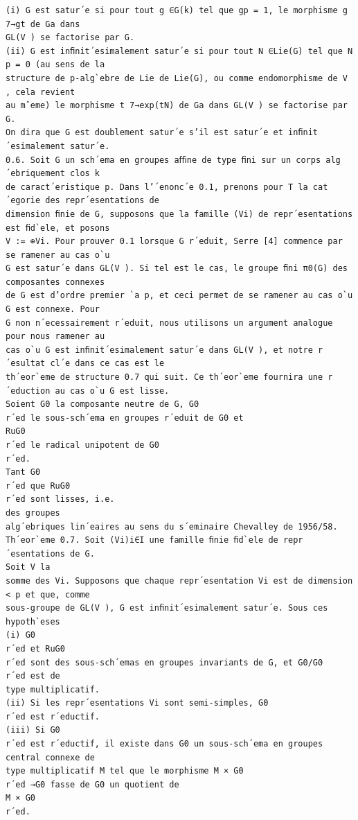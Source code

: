\documentclass[10pt]{article}
\begin{document}
\begin{verbatim}
(i) G est satur´e si pour tout g ∈G(k) tel que gp = 1, le morphisme g 7→gt de Ga dans
GL(V ) se factorise par G.
(ii) G est inﬁnit´esimalement satur´e si pour tout N ∈Lie(G) tel que N p = 0 (au sens de la
structure de p-alg`ebre de Lie de Lie(G), ou comme endomorphisme de V , cela revient
au mˆeme) le morphisme t 7→exp(tN) de Ga dans GL(V ) se factorise par G.
On dira que G est doublement satur´e s’il est satur´e et inﬁnit´esimalement satur´e.
0.6. Soit G un sch´ema en groupes aﬃne de type ﬁni sur un corps alg´ebriquement clos k
de caract´eristique p. Dans l’´enonc´e 0.1, prenons pour T la cat´egorie des repr´esentations de
dimension ﬁnie de G, supposons que la famille (Vi) de repr´esentations est ﬁd`ele, et posons
V := ⊕Vi. Pour prouver 0.1 lorsque G r´eduit, Serre [4] commence par se ramener au cas o`u
G est satur´e dans GL(V ). Si tel est le cas, le groupe ﬁni π0(G) des composantes connexes
de G est d’ordre premier `a p, et ceci permet de se ramener au cas o`u G est connexe. Pour
G non n´ecessairement r´eduit, nous utilisons un argument analogue pour nous ramener au
cas o`u G est inﬁnit´esimalement satur´e dans GL(V ), et notre r´esultat cl´e dans ce cas est le
th´eor`eme de structure 0.7 qui suit. Ce th´eor`eme fournira une r´eduction au cas o`u G est lisse.
Soient G0 la composante neutre de G, G0
r´ed le sous-sch´ema en groupes r´eduit de G0 et
RuG0
r´ed le radical unipotent de G0
r´ed.
Tant G0
r´ed que RuG0
r´ed sont lisses, i.e.
des groupes
alg´ebriques lin´eaires au sens du s´eminaire Chevalley de 1956/58.
Th´eor`eme 0.7. Soit (Vi)i∈I une famille ﬁnie ﬁd`ele de repr´esentations de G.
Soit V la
somme des Vi. Supposons que chaque repr´esentation Vi est de dimension < p et que, comme
sous-groupe de GL(V ), G est inﬁnit´esimalement satur´e. Sous ces hypoth`eses
(i) G0
r´ed et RuG0
r´ed sont des sous-sch´emas en groupes invariants de G, et G0/G0
r´ed est de
type multiplicatif.
(ii) Si les repr´esentations Vi sont semi-simples, G0
r´ed est r´eductif.
(iii) Si G0
r´ed est r´eductif, il existe dans G0 un sous-sch´ema en groupes central connexe de
type multiplicatif M tel que le morphisme M × G0
r´ed →G0 fasse de G0 un quotient de
M × G0
r´ed.


\end{verbatim}
\end{document}
